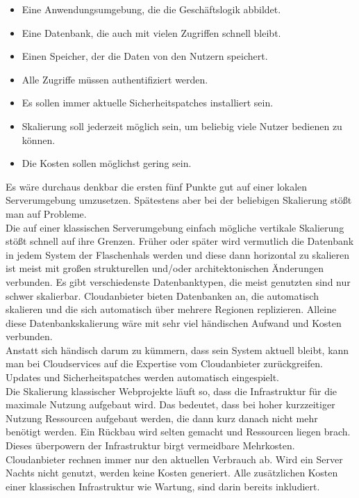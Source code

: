 \documentclass[a4paper, 12pt]{scrreprt}
\renewcommand\_{\textunderscore\allowbreak}
\begin{document}
\begin{itemize}
\item Eine Anwendungsumgebung, die die Geschäftslogik abbildet.
\item Eine Datenbank, die auch mit vielen Zugriffen schnell bleibt.
\item Einen Speicher, der die Daten von den Nutzern speichert.
\item Alle Zugriffe müssen authentifiziert werden.
\item Es sollen immer aktuelle Sicherheitspatches installiert sein.
\item Skalierung soll jederzeit möglich sein, um beliebig viele Nutzer bedienen zu können.
\item Die Kosten sollen möglichst gering sein.
\end{itemize}
Es wäre durchaus denkbar die ersten fünf Punkte gut auf einer lokalen Serverumgebung umzusetzen. Spätestens aber bei der beliebigen Skalierung stößt man auf Probleme. 
\\
Die auf einer klassischen Serverumgebung einfach mögliche vertikale Skalierung stößt schnell auf ihre Grenzen. Früher oder später wird vermutlich die Datenbank in jedem System der Flaschenhals werden und diese dann horizontal zu skalieren ist meist mit großen strukturellen und/oder architektonischen Änderungen verbunden. Es gibt verschiedenste Datenbanktypen, die meist genutzten sind nur schwer skalierbar. Cloudanbieter bieten Datenbanken an, die automatisch skalieren und die sich automatisch über mehrere Regionen replizieren. Alleine diese Datenbankskalierung wäre mit sehr viel händischen Aufwand und Kosten verbunden. \\ 
Anstatt sich händisch darum zu kümmern, dass sein System aktuell bleibt, kann man bei Cloudservices auf die Expertise vom Cloudanbieter zurückgreifen. Updates und Sicherheitspatches werden automatisch eingespielt. \\
Die Skalierung klassischer Webprojekte läuft so, dass die Infrastruktur für die maximale Nutzung aufgebaut wird. Das bedeutet, dass bei hoher kurzzeitiger Nutzung Ressourcen aufgebaut werden, die dann kurz danach nicht mehr benötigt werden. Ein Rückbau wird selten gemacht und Ressourcen liegen brach. Dieses überpowern der Infrastruktur birgt vermeidbare Mehrkosten. Cloudanbieter rechnen immer nur den aktuellen Verbrauch ab. Wird ein Server Nachts nicht genutzt, werden keine Kosten generiert. Alle zusätzlichen Kosten einer klassischen Infrastruktur wie Wartung, sind darin bereits inkludiert. \\
\end{document}

